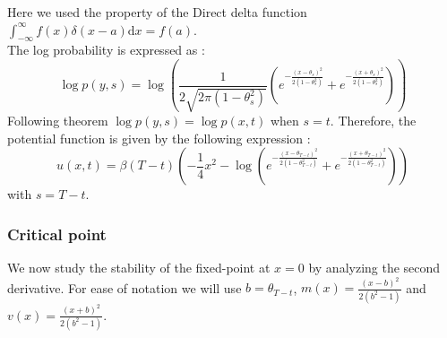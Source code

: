 Here we used the property of the Direct delta function  $\int_{-\infty}^{\infty} f(x)\delta(x-a) \mathrm{d}x = f(a)$.\\
The log probability is expressed as :
\begin{equation}
    \log  p(y,s) = \log \left( \frac{1}{2\sqrt{2\pi (1 - \theta_{s}^2) }}\left(e^{-\frac{(x- \theta_s)^2}{2(1 - \theta_{s}^2)}} + e^{-\frac{(x + \theta_s)^2}{2(1 - \theta_{s}^2)}}\right)\right)
\end{equation}
Following \cite{anderson1982reverse} theorem $\log p(y,s) = \log p(x, t)$ when $s=t$. Therefore, the potential function is given by the following expression :
\begin{equation}
    u(x, t) = \beta(T- t) \left( -\frac{1}{4} x^2 -  \log{\left(e^{-\frac{(x - \theta_{T-t})^2}{2 (1 - \theta_{T-t}^2)}} + e^{-\frac{(x + \theta_{T-t})^2}{2 (1 - \theta_{T-t}^2)}} \right)} \right)
\end{equation}
with $s=T-t$.

\subsubsection{Critical point}
We now study the stability of the fixed-point at $x=0$ by analyzing the second derivative.
For ease of notation we will use $b=\theta_{T-t}$, $m(x)=\frac{(x - b)^2}{2 (b^2 - 1)}$  and $v(x)=\frac{(x + b)^2}{2 (b^2-1)}$.

